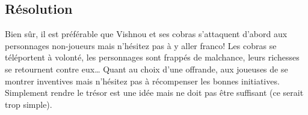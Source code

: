 \subsection{Résolution}

Bien sûr, il est préférable que Vishnou et ses cobras s'attaquent d'abord aux personnages non-joueurs mais n'hésitez pas à y aller franco!
Les cobras se téléportent à volonté, les personnages sont frappés de malchance, leurs richesses se retournent contre eux\dots
Quant au choix d'une offrande, aux joueuses de se montrer inventives mais n'hésitez pas à récompenser les bonnes initiatives.
Simplement \og rendre \fg le trésor est une idée mais ne doit pas être suffisant (ce serait trop simple).

